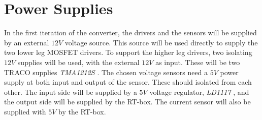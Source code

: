 \section{Power Supplies}\label{power_supplies}
In the first iteration of the converter, the drivers and the sensors will be supplied by an external $12V$ voltage source. This source will be used directly to supply the two lower leg MOSFET drivers. To support the higher leg drivers, two isolating $12V$ supplies will be used, with the external $12V$ as input. These will be two TRACO supplies \textit{TMA1212S} \cite{traco_tma1212}. The chosen voltage sensors need a $5V$ power supply at both input and output of the sensor. These should isolated from each other. The input side will be supplied by a $5V$ voltage regulator, \textit{LD1117} \cite{LD1117}, and the output side will be supplied by the RT-box. The current sensor will also be supplied with $5V$ by the RT-box.
